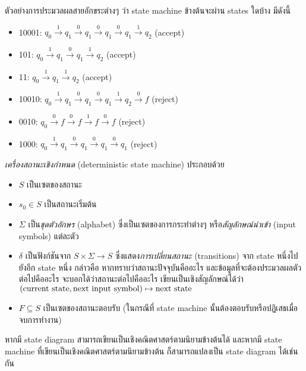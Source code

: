 \begin{example}
ตัวอย่างการประมวลผลสายอักขระต่างๆ ว่า state machine ข้างต้นจะผ่าน states ใดบ้าง มีดังนี้
\begin{itemize}
\item 10001: $q_0 \xrightarrow{1} q_1 \xrightarrow{0} q_1 \xrightarrow{0} q_1 \xrightarrow{0} q_1 \xrightarrow{1} q_2$ (accept)
\item 101: $q_0 \xrightarrow{1} q_1 \xrightarrow{0} q_1 \xrightarrow{1} q_2$ (accept)
\item 11: $q_0 \xrightarrow{1} q_1 \xrightarrow{1} q_2$ (accept)
\item 10010: $q_0 \xrightarrow{1} q_1 \xrightarrow{0} q_1 \xrightarrow{0} q_1 \xrightarrow{1} q_2 \xrightarrow{0} f$ (reject)
\item 0010: $q_0 \xrightarrow{0} f \xrightarrow{0} f \xrightarrow{1} f \xrightarrow{0} f$ (reject)
\item 1000: $q_0 \xrightarrow{1} q_1 \xrightarrow{0} q_1 \xrightarrow{0} q_1 \xrightarrow{0} q_1$ (reject)
\end{itemize}
\end{example}

\begin{definition}
\emph{เครื่องสถานะเชิงกำหนด} (deterministic state machine) ประกอบด้วย
\begin{itemize}
\item $S$ เป็นเซตของสถานะ
\item $s_0\in S$ เป็นสถานะเริ่มต้น
\item $\Sigma$ เป็น\emph{ชุดตัวอักษร} (alphabet) ซึ่งเป็นเซตของการกระทำต่างๆ หรือ\emph{สัญลักษณ์นำเข้า} (input symbols) แต่ละตัว
\item $\delta$ เป็นฟังก์ชันจาก $S\times\Sigma\to S$ ซึ่งแสดง\emph{การเปลี่ยนสถานะ} (transitions) จาก state หนึ่งไปยังอีก state หนึ่ง กล่าวคือ หากทราบว่าสถานะปัจจุบันคืออะไร และข้อมูลที่จะต้องประมวลผลตัวต่อไปคืออะไร จะบอกได้ว่าสถานะต่อไปคืออะไร เขียนเป็นเชิงสัญลักษณ์ได้ว่า $(\textup{current state},\textup{next input symbol})\mapsto\textup{next state}$
\item $F\subseteq S$ เป็นเซตของสถานะตอบรับ (ในกรณีที่ state machine นั้นต้องตอบรับหรือปฏิเสธเมื่อจบการทำงาน)
\end{itemize}
\end{definition}

หากมี state diagram สามารถเขียนเป็นเชิงคณิตศาสตร์ตามนิยามข้างต้นได้ และหากมี state machine ที่เขียนเป็นเชิงคณิตศาสตร์ตามนิยามข้างต้น ก็สามารถแปลงเป็น state diagram ได้เช่นกัน

